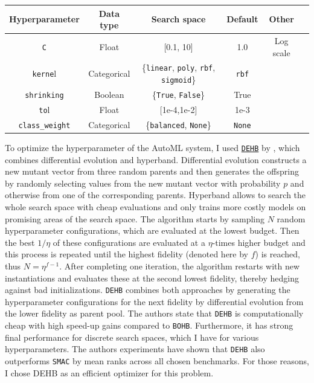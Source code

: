 \documentclass[11pt]{article}
\begin{document}
\vspace{-0.3cm}
\begin{table}[H]
\centering
\begin{tabular}{ | c | c | c | c | c | c | }
 \hline
  Hyperparameter & Data type & Search space & Default & Other \\
 \hline
 \texttt{C} & Float & [0.1, 10]  & 1.0 & Log scale \\ 
 \texttt{kerne}l & Categorical & \{\texttt{linear}, \texttt{poly}, \texttt{rbf}, \texttt{sigmoid}\}  & \texttt{rbf} &   \\ 
 \texttt{shrinking} & Boolean & \{\texttt{True}, \texttt{False}\} & True &  \\ 
 \texttt{to}l & Float & [1e-4,1e-2] & 1e-3 &  \\ 
 \texttt{class\_weight} & Categorical & \{\texttt{balanced}, \texttt{None}\}  & \texttt{None} &  \\ 
 \hline
\end{tabular}
\end{table}
\vspace{-0.3cm}

To optimize the hyperparameter of the AutoML system, I used \href{https://github.com/automl/dehb}{\texttt{DEHB}} by \citet{dehb}, which combines differential evolution and hyperband. Differential evolution constructs a new mutant vector from three random parents and then generates the offspring by randomly selecting values from the new mutant vector with probability $p$ and otherwise from one of the corresponding parents. Hyperband allows to search the whole search space with cheap evaluations and only trains more costly models on promising areas of the search space. The algorithm starts by sampling $N$ random hyperparameter configurations, which are evaluated at the lowest budget. Then the best $1/\eta$ of these configurations are evaluated at a $\eta$-times higher budget and this process is repeated until the highest fidelity (denoted here by $f$) is reached, thus $N=\eta^{f-1}$. After completing one iteration, the algorithm restarts with new instantiations and evaluates these at the second lowest fidelity, thereby hedging against bad initializations. \texttt{DEHB} combines both approaches by generating the hyperparameter configurations for the next fidelity by differential evolution from the lower fidelity as parent pool. The authors state that \texttt{DEHB} is computationally cheap with high speed-up gains compared to \texttt{BOHB}. Furthermore, it has strong final performance for discrete search spaces, which I have for various hyperparameters. The authors experiments have shown that \texttt{DEHB} also outperforms \texttt{SMAC} by mean ranks across all chosen benchmarks. For those reasons, I chose DEHB as an efficient optimizer for this problem. \\
\end{document}
